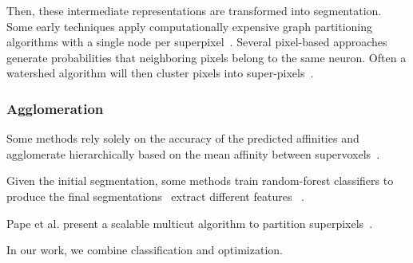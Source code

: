 Then, these intermediate representations are transformed into segmentation.
Some early techniques apply computationally expensive graph partitioning algorithms with a single node per superpixel~\cite{andres2012globally}.
Several pixel-based approaches generate probabilities that neighboring pixels belong to the same neuron.
Often a watershed algorithm will then cluster pixels into super-pixels~\cite{zlateski2015image}.

\subsubsection{Agglomeration}
Some methods rely solely on the accuracy of the predicted affinities and agglomerate hierarchically based on the mean affinity between supervoxels~\cite{lee2017superhuman,funke2017deep}.

Given the initial segmentation, some methods train random-forest classifiers to produce the final segmentations~\cite{seymour2016rhoananet,nunez2014graph,parag2017anisotropic,zlateski2015image,10.1371/journal.pone.0125825}
extract different features
~\cite{jain2011learning,bogovic2013learned}.

Pape et al. present a scalable multicut algorithm to partition superpixels~\cite{beier2017multicut}.

In our work, we combine classification and optimization.

